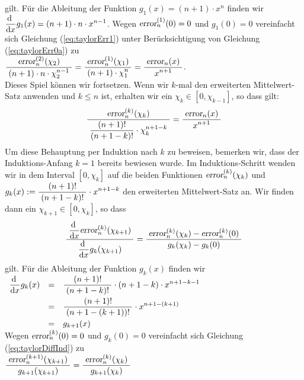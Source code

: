 gilt.
F\"ur die Ableitung der Funktion $g_1(x) = (n+1)\cdot x^{n}$ finden wir $\dfo g_1(x) = (n+1) \cdot  n \cdot x^{n-1}$.
Wegen $\erri{0}{1} = 0$ und $g_1(0) = 0$  vereinfacht sich Gleichung (\ref{eq:taylorErr1})
unter Ber\"ucksichtigung von Gleichung (\ref{eq:taylorErr0a}) zu
\\[0.3cm]
\hspace*{1.3cm} $\bruch{\erri{\chi_2}{2}}{(n+1)\cdot n\cdot \chi_2^{n-1}} =
\bruch{\erri{\chi_1}{1}}{(n+1)\cdot \chi_1^{n}} = \bruch{\textsl{error}_n(x)}{x^{n+1}}$.
\\[0.3cm]
Dieses Spiel k\"onnen wir fortsetzen.  Wenn wir $k$-mal den erweiterten Mittelwert-Satz
anwenden und $k \leq n$ ist, erhalten wir ein $\chi_k \in [0,\chi_{k-1}]$, so dass gilt:
\begin{equation}
  \label{eq:taylorErrk}
\bruch{\erri{\chi_k}{k}}{\frac{(n+1)!}{(n+1-k)!}\cdot \chi_k^{n+1-k}} = 
  \bruch{\textsl{error}_n(x)}{x^{n+1}}  
\end{equation}
Um diese Behauptung per Induktion nach $k$ zu beweisen, bemerken wir, dass der Induktions-Anfang
$k=1$ bereits bewiesen wurde.  Im Induktions-Schritt
wenden wir in dem Interval $[0,\chi_k]$
auf die beiden Funktionen $\erri{\chi_k}{k}$ und 
$g_{k}(x) :=  \bruch{(n+1)!}{(n+1 - k)!}\cdot x^{n+1-k}$ den erweiterten
Mittelwert-Satz an.  Wir finden dann ein $\chi_{k+1} \in [0,\chi_k]$, so dass
\begin{equation}
  \label{eq:taylorDiffInd}
\bruch{\dfo \erri{\chi_{k+1}}{k}}{\dfo g_{k}(\chi_{k+1})} =
 \bruch{\erri{\chi_k}{k} - \erri{0}{k}}{g_{k}(\chi_k) - g_{k}(0)} 
\end{equation}
gilt.  
F\"ur die Ableitung der Funktion $g_k(x)$ finden wir 
\\[0.3cm]
\hspace*{1.3cm}
$
\begin{array}[t]{lcl}
  \dfo g_k(x) & = & \bruch{(n+1)!}{(n+1-k)!} \cdot (n+1-k) \cdot x^{n+1-k-1} \\[0.3cm]
             & = &  \bruch{(n+1)!}{(n+1-(k+1))!} \cdot x^{n+1-(k+1)} \\[0.3cm]
             & = & g_{k+1}(x)
\end{array}
$
\\[0.3cm]
Wegen $\erri{0}{k} = 0$ und $g_k(0) = 0$  vereinfacht sich Gleichung
(\ref{eq:taylorDiffInd}) zu \\[0.3cm]
\hspace*{1.3cm}
$\bruch{\erri{\chi_{k+1}}{k+1}}{g_{k+1}(\chi_{k+1})} =
 \bruch{\erri{\chi_k}{k}}{g_{k+1}(\chi_k)} 
$
\\[0.3cm]
